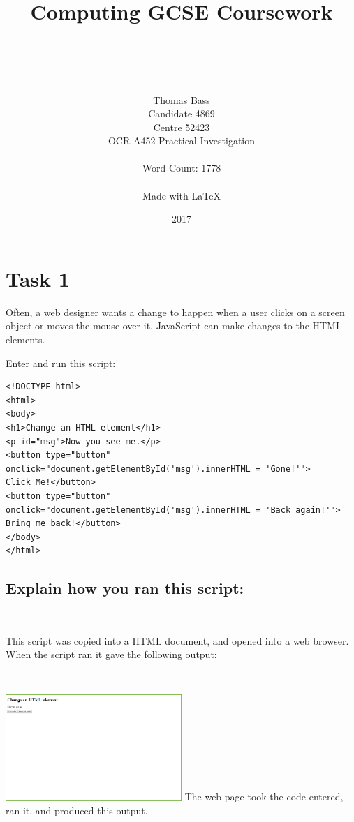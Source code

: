 \documentclass[a4paper]{article}
\title{Computing GCSE Coursework}
\author{\\ \\ \\ \\ Thomas Bass\\Candidate 4869\\Centre 52423\\OCR A452 Practical Investigation\\\\Word Count: 1778\\\\Made with \LaTeX}
\date{2017}
\begin{document}
\maketitle
\pagebreak
\renewcommand*\contentsname{Summary}
\tableofcontents
\pagebreak
\section{Task 1}
Often, a web designer wants a change to happen when a user clicks on a screen object or moves the mouse over it. JavaScript can make changes to the HTML elements. \par
\noindent Enter and run this script: \par \par
\begin{lstlisting}
<!DOCTYPE html>
<html>
<body>
<h1>Change an HTML element</h1>
<p id="msg">Now you see me.</p>
<button type="button"
onclick="document.getElementById('msg').innerHTML = 'Gone!'">
Click Me!</button>
<button type="button"
onclick="document.getElementById('msg').innerHTML = 'Back again!'">
Bring me back!</button>
</body>
</html>
\end{lstlisting}
\subsection{Explain how you ran this script:} ~\par	
This script was copied into a HTML document, and opened into a web browser. 
When the script ran it gave the following output: ~\par ~\par
\noindent\includegraphics[width=0.5\textwidth, left, width=\linewidth, frame]{Picture1.png}
The web page took the code entered, ran it, and produced this output.
\newpage
\end{document}
